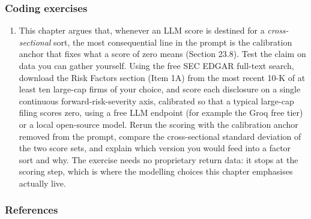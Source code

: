\subsubsection{Coding exercises}

\begin{enumerate}
\item This chapter argues that, whenever an LLM score is destined for a
\textit{cross-sectional} sort, the most consequential line in the prompt is the
calibration anchor that fixes what a score of zero means (Section 23.8). Test
the claim on data you can gather yourself. Using the free SEC EDGAR full-text
search, download the Risk Factors section (Item 1A) from the most recent 10-K
of at least ten large-cap firms of your choice, and score each disclosure on a
single continuous forward-risk-severity axis, calibrated so that a typical
large-cap filing scores zero, using a free LLM endpoint (for example the Groq
free tier) or a local open-source model. Rerun the scoring with the
calibration anchor removed from the prompt, compare the cross-sectional
standard deviation of the two score sets, and explain which version you would
feed into a factor sort and why. The exercise needs no proprietary return
data: it stops at the scoring step, which is where the modelling choices this
chapter emphasises actually live.
\end{enumerate}

\subsubsection{References}